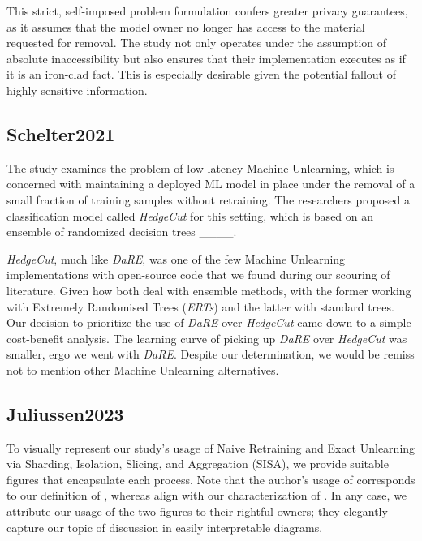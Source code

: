         This strict, self-imposed problem formulation confers greater privacy guarantees, as it assumes that the model owner no longer has access to the material requested for removal. The study not only operates under the assumption of absolute inaccessibility but also ensures that their implementation executes as if it is an iron-clad fact. This is especially desirable given the potential fallout of highly sensitive information.
    
    \subsection{Schelter2021}
    \label{subsec:Schelter2021}
    
        The study examines the problem of low-latency Machine Unlearning, which is concerned with maintaining a deployed ML model in place under the removal of a small fraction of training samples without retraining. The researchers proposed a classification model called \textit{HedgeCut} for this setting, which is based on an ensemble of randomized decision trees ____.
        
        \textit{HedgeCut}, much like \textit{DaRE}, was one of the few Machine Unlearning implementations with open-source code that we found during our scouring of literature. Given how both deal with ensemble methods, with the former working with Extremely Randomised Trees (\textit{ERTs}) and the latter with standard trees. Our decision to prioritize the use of \textit{DaRE} over \textit{HedgeCut} came down to a simple cost-benefit analysis. The learning curve of picking up \textit{DaRE} over \textit{HedgeCut} was smaller, ergo we went with \textit{DaRE}. Despite our determination, we would be remiss not to mention other Machine Unlearning alternatives.
    
    \subsection{Juliussen2023}
    \label{subsec:Juliussen2023}
    
        To visually represent our study's usage of Naive Retraining and Exact Unlearning via Sharding, Isolation, Slicing, and Aggregation (SISA), we provide suitable figures that encapsulate each process. Note that the author's usage of  corresponds to our definition of , whereas  align with our characterization of . In any case, we attribute our usage of the two figures to their rightful owners; they elegantly capture our topic of discussion in easily interpretable diagrams.
        
